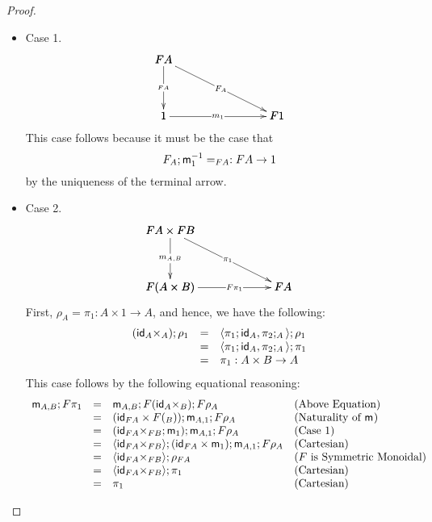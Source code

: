 \documentclass{article}
\let\mto\to
\let\to\rightarrow
\newcommand{\id}[0]{\mathsf{id}}
\let\t\relax
\newcommand{\t}[0]{\mathsf{t}}
\newcommand{\m}[1]{\mathsf{m}_{#1}}
\begin{document}
\begin{proof}
  \ \\
  \begin{itemize}
  \item[] Case 1.\\
    \[
      \bfig
      \btriangle|mmm|<1000,500>[
        FA`
        1`
        F1;
        \t_{FA}`
        F\t_{A}`
        m_1]
      \efig
    \]
    This case follows because it must be the case that
    \[F\t_{A};\m{1}^{-1} = \t_{FA} : FA \mto 1\]
    by the uniqueness of the terminal arrow.
    
  \item[] Case 2.\\
    \[
      \bfig
      \btriangle|mmm|<1000,500>[
        FA \times FB`
        F(A \times B)`
        FA;
        m_{A,B}`
        \pi_1`
        F\pi_1]
      \efig
      \]
      First, $\rho_A = \pi_1 : A \times 1 \mto A$, and hence, we have the following:
      \[
      \begin{array}{lll}
        (\id_A \times \t_A);\rho_1 & = & \langle \pi_1;\id_A, \pi_2;\t_A \rangle;\rho_1\\
        & = & \langle \pi_1;\id_A, \pi_2;\t_A \rangle;\pi_1\\
        & = & \pi_1 : A \times B \mto A
      \end{array}
      \]
      This case follows by the following equational reasoning:
      \[
      \begin{array}{llllllll}
        \m{A,B};F\pi_1
        & = & \m{A,B};F(\id_A \times \t_B);F\rho_A & \text{(Above Equation)}\\
        & = & (\id_{FA} \times F(\t_{B}));\m{A,1};F\rho_A & \text{(Naturality of $\m{}$)}\\
        & = & (\id_{FA} \times \t_{FB};\m{1});\m{A,1};F\rho_A & \text{(Case 1)}\\
        & = & \langle \id_{FA} \times \t_{FB} \rangle;(\id_{FA} \times \m{1});\m{A,1};F\rho_A & \text{(Cartesian)}\\
        & = & \langle \id_{FA} \times \t_{FB} \rangle;\rho_{FA} & \text{($F$ is Symmetric Monoidal)}\\
        & = & \langle \id_{FA} \times \t_{FB} \rangle;\pi_1 & \text{(Cartesian)}\\
        & = & \pi_1 & \text{(Cartesian)}\\ 
      \end{array}
      \]
    

\end{itemize}
\end{proof}
\end{document}
